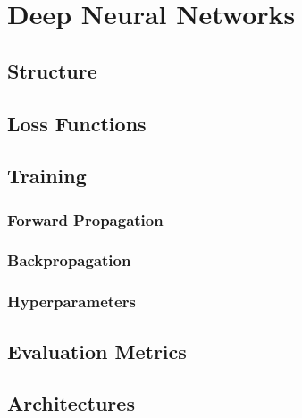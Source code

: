 \chapter{Deep Neural Networks}

\section{Structure}

\section{Loss Functions}

\section{Training}

\subsection{Forward Propagation}

\subsection{Backpropagation}

\subsection{Hyperparameters}

\section{Evaluation Metrics}

\section{Architectures}